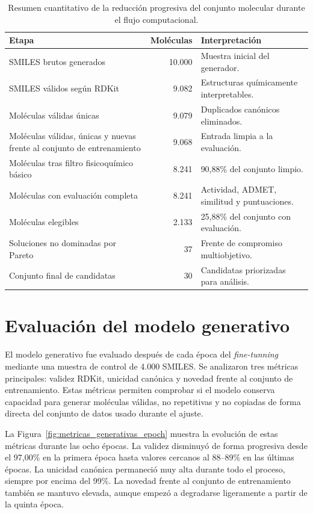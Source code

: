 \documentclass[IB]{TFUOC}%
\begin{document}
\begin{table}[H]
    \centering
    \small
    \begin{tabular}{p{7.8cm} r p{3.8cm}}
        \hline
        \textbf{Etapa} & \textbf{Moléculas} & \textbf{Interpretación} \\
        \hline
        SMILES brutos generados & 10.000 & Muestra inicial del generador. \\
        SMILES válidos según RDKit & 9.082 & Estructuras químicamente interpretables. \\
        Moléculas válidas únicas & 9.079 & Duplicados canónicos eliminados. \\
        Moléculas válidas, únicas y nuevas frente al conjunto de entrenamiento & 9.068 & Entrada limpia a la evaluación. \\
        Moléculas tras filtro fisicoquímico básico & 8.241 & 90,88\% del conjunto limpio. \\
        Moléculas con evaluación completa & 8.241 & Actividad, ADMET, similitud y puntuaciones. \\
        Moléculas elegibles & 2.133 & 25,88\% del conjunto con evaluación. \\
        Soluciones no dominadas por Pareto & 37 & Frente de compromiso multiobjetivo. \\
        Conjunto final de candidatas & 30 & Candidatas priorizadas para análisis. \\
        \hline
    \end{tabular}
    \caption{Resumen cuantitativo de la reducción progresiva del conjunto molecular durante el flujo computacional.}
    \label{tab:resumen_reduccion_pipeline_resultados}
\end{table}

\section{Evaluación del modelo generativo}

El modelo generativo fue evaluado después de cada época del \textit{fine-tunning} mediante una muestra de control de 4.000 SMILES. Se analizaron tres métricas principales: validez RDKit, unicidad canónica y novedad frente al conjunto de entrenamiento. Estas métricas permiten comprobar si el modelo conserva capacidad para generar moléculas válidas, no repetitivas y no copiadas de forma directa del conjunto de datos usado durante el ajuste.

La Figura~\ref{fig:metricas_generativas_epoch} muestra la evolución de estas métricas durante las ocho épocas. La validez disminuyó de forma progresiva desde el 97,00\% en la primera época hasta valores cercanos al 88--89\% en las últimas épocas. La unicidad canónica permaneció muy alta durante todo el proceso, siempre por encima del 99\%. La novedad frente al conjunto de entrenamiento también se mantuvo elevada, aunque empezó a degradarse ligeramente a partir de la quinta época.
\end{document}

